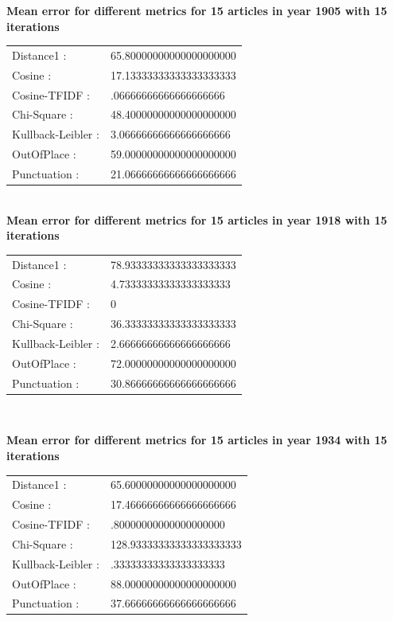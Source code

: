 \textbf{Mean error for different metrics for 15 articles in year 1905 with 15 iterations}\\
\begin{tabular}{p{3cm} p{5cm}}
    Distance1 :& 65.80000000000000000000\\
    Cosine :& 17.13333333333333333333\\
    Cosine-TFIDF :& .06666666666666666666\\
    Chi-Square :& 48.40000000000000000000\\
    Kullback-Leibler :& 3.06666666666666666666\\
    OutOfPlace :& 59.00000000000000000000\\
    Punctuation :& 21.06666666666666666666\\
\end{tabular}\\
 
\textbf{Mean error for different metrics for 15 articles in year 1918 with 15 iterations}\\
\begin{tabular}{p{3cm} p{5cm}}
    Distance1 :& 78.93333333333333333333\\
    Cosine :& 4.73333333333333333333\\
    Cosine-TFIDF :& 0\\
    Chi-Square :& 36.33333333333333333333\\
    Kullback-Leibler :& 2.66666666666666666666\\
    OutOfPlace :& 72.00000000000000000000\\
    Punctuation :& 30.86666666666666666666\\
\end{tabular}\\
 
\newpage{}

\textbf{Mean error for different metrics for 15 articles in year 1934 with 15 iterations}\\
\begin{tabular}{p{3cm} p{5cm}}
    Distance1 :& 65.60000000000000000000\\
    Cosine :& 17.46666666666666666666\\
    Cosine-TFIDF :& .80000000000000000000\\
    Chi-Square :& 128.93333333333333333333\\
    Kullback-Leibler :& .33333333333333333333\\
    OutOfPlace :& 88.00000000000000000000\\
    Punctuation :& 37.66666666666666666666\\
\end{tabular}\\
 
